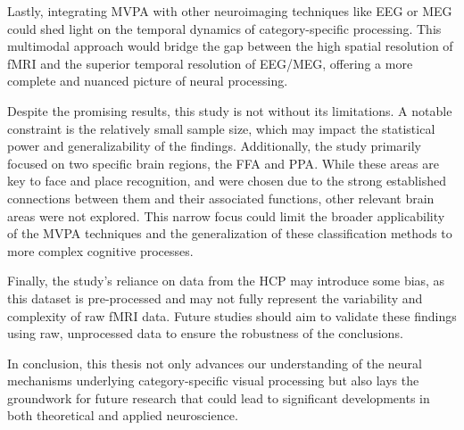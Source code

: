 Lastly, integrating \gls{MVPA} with other neuroimaging techniques like \gls{EEG} or \gls{MEG} could shed light on the temporal dynamics of category-specific processing. This multimodal approach would bridge the gap between the high spatial resolution of \gls{fMRI} and the superior temporal resolution of \gls{EEG}/\gls{MEG}, offering a more complete and nuanced picture of neural processing.

Despite the promising results, this study is not without its limitations. A notable constraint is the relatively small sample size, which may impact the statistical power and generalizability of the findings. Additionally, the study primarily focused on two specific brain regions, the \gls{FFA} and \gls{PPA}. While these areas are key to face and place recognition, and were chosen due to the strong established connections between them and their associated functions, other relevant brain areas were not explored. This narrow focus could limit the broader applicability of the \gls{MVPA} techniques and the generalization of these classification methods to more complex cognitive processes.

Finally, the study's reliance on data from the \gls{HCP} may introduce some bias, as this dataset is pre-processed and may not fully represent the variability and complexity of raw \gls{fMRI} data. Future studies should aim to validate these findings using raw, unprocessed data to ensure the robustness of the conclusions.

In conclusion, this thesis not only advances our understanding of the neural mechanisms underlying category-specific visual processing but also lays the groundwork for future research that could lead to significant developments in both theoretical and applied neuroscience.